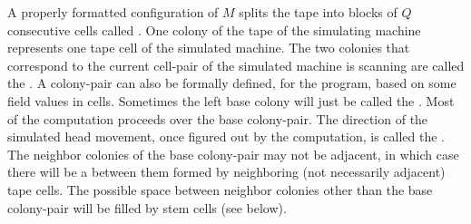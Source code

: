 \documentclass[11pt]{memoir}
\theoremstyle{definition} %
\newcommand{\fld}[1]{\ensuremath{\textit{#1\/}}}
\newcommand{\Q}{Q} %
\newcommand{\Addr}{\fld{Addr}}
\newcommand{\Drift}{\fld{Drift}}
\newcommand{\Hold}{\fld{Hold}}
\begin{document}


A properly formatted configuration of \( M \) splits the tape into blocks of \( \Q \)
consecutive cells called .
One colony of the tape of the simulating
machine represents one tape cell of the simulated machine.
The two colonies that correspond to the current cell-pair of the
simulated machine is scanning are called the .
A colony-pair can also be formally defined,
for the program, based on some field values in cells.
Sometimes the left base colony will just be called the .
Most of the computation proceeds over the base colony-pair.
The direction of the simulated head movement, once figured out by the computation,
is called the .
The neighbor colonies of the base colony-pair may not be adjacent, in which case there will be
a  between them formed by neighboring (not necessarily adjacent) tape cells.
The possible space between neighbor colonies other than
the base colony-pair will be filled by stem cells (see below).
\end{document}
